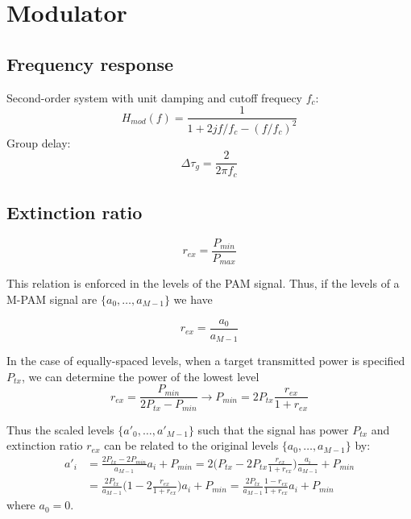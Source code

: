 \section{Modulator}
\subsection{Frequency response}

Second-order system with unit damping and cutoff frequecy $f_c$:
\begin{equation}
	H_{mod}(f) =  \frac{1}{1 + 2jf/f_c - (f/f_c)^2}
\end{equation}
Group delay:
\begin{equation}
	\Delta\tau_g = \frac{2}{2\pi f_c}
\end{equation}

\subsection{Extinction ratio}
\begin{equation}
	r_{ex} = \frac{P_{min}}{P_{max}}
\end{equation}

This relation is enforced in the levels of the PAM signal. Thus, if the levels of a M-PAM signal are $\{a_0, \ldots, a_{M-1}\}$ we have

\begin{equation}
	r_{ex} = \frac{a_0}{a_{M-1}}
\end{equation}

In the case of equally-spaced levels, when a target transmitted power is specified $P_{tx}$, we can determine the power of the lowest level
\begin{equation}
	r_{ex} = \frac{P_{min}}{2P_{tx} - P_{min}} \rightarrow P_{min} = 2P_{tx}\frac{r_{ex}}{1 + r_{ex}}
\end{equation}

Thus the scaled levels $\{a'_0, \ldots, a'_{M-1}\}$ such that the signal has power $P_{tx}$ and extinction ratio $r_{ex}$ can be related to the original levels $\{a_0, \ldots, a_{M-1}\}$ by:
\begin{align} \nonumber
	a'_i &= \frac{2P_{tx} - 2P_{min}}{a_{M-1}}a_i + P_{min} = 2\bigg(P_{tx} - 2P_{tx}\frac{r_{ex}}{1 + r_{ex}}\bigg)\frac{a_i}{a_{M-1}} + P_{min} \\
	&= \frac{2P_{tx}}{a_{M-1}}\bigg(1 - 2\frac{r_{ex}}{1 + r_{ex}}\bigg)a_i + P_{min} = \frac{2P_{tx}}{a_{M-1}}\frac{1-r_{ex}}{1 + r_{ex}}a_i + P_{min} 
\end{align}
where $a_0 = 0$.

